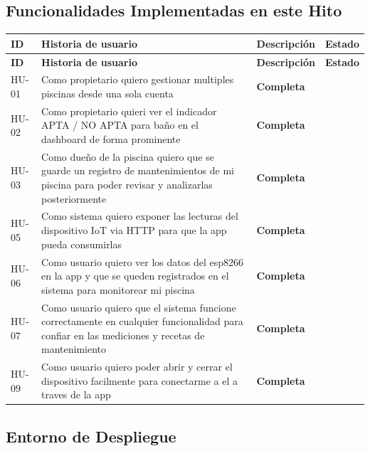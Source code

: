 \documentclass[11pt, a4paper]{article}
\begin{document}
\subsection{Funcionalidades Implementadas en este Hito}

\begin{longtable}{@{} p{1.4cm} p{4cm} p{6.8cm} p{2cm} @{}}
  \toprule
  \textbf{ID} & \textbf{Historia de usuario} & \textbf{Descripción} & \textbf{Estado} \\
  \midrule
  \endfirsthead
  \toprule
  \textbf{ID} & \textbf{Historia de usuario} & \textbf{Descripción} & \textbf{Estado} \\
  \midrule
  \endhead
  HU-01 & Como propietario quiero gestionar multiples piscinas desde una sola cuenta & \textcolor{success}{\textbf{Completa}} \\
  HU-02 & Como propietario quieri ver el indicador APTA / NO APTA para baño en el dashboard de forma prominente & \textcolor{success}{\textbf{Completa}} \\
  HU-03 & Como dueño de la piscina quiero que se guarde un registro de mantenimientos de mi piscina para poder revisar y analizarlas posteriormente & \textcolor{accent}{\textbf{Completa}} \\
  HU-05 & Como sistema quiero exponer las lecturas del dispositivo IoT via HTTP para que la app pueda consumirlas & \textcolor{accent}{\textbf{Completa}} \\
  HU-06 & Como usuario quiero ver los datos del esp8266 en la app y que se queden registrados en el sistema para monitorear mi piscina& \textcolor{accent}{\textbf{Completa}} \\
  HU-07 & Como usuario quiero que el sistema funcione correctamente en cualquier funcionalidad para confiar en las mediciones y recetas de mantenimiento & \textcolor{accent}{\textbf{Completa}} \\
  HU-09 & Como usuario quiero poder abrir y cerrar el dispositivo facilmente para conectarme a el a traves de la app & \textcolor{accent}{\textbf{Completa}} \\
  \bottomrule
\end{longtable}

\subsection{Entorno de Despliegue}
\end{document}
